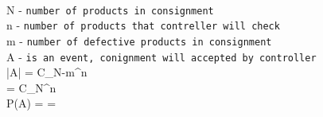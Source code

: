 \documentclass{article}
\begin{document}
\\ N - \texttt{number of products in consignment}
\\ n - \texttt{number of products that contreller will check}
\\ m - \texttt{number of defective products in consignment}
\\ A - \texttt{is an event, conignment will accepted by controller}
\\ |A| = C_{N-m}^{n}
\\ \Omega = C_{N}^{n}
\\ P(A) = =
\end{document}
